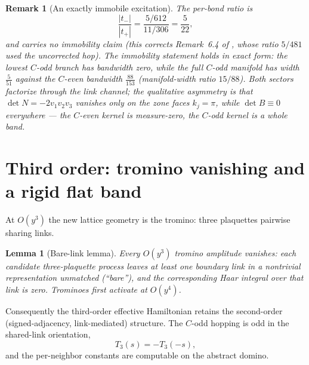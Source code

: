 \documentclass[11pt]{article}
\newtheorem{lemma}[theorem]{Lemma}
\newtheorem{remark}[theorem]{Remark}
\begin{document}
\begin{remark}[An exactly immobile excitation]\label{rem:immobile}
The per-bond ratio is
\[
\frac{|t_-|}{|t_+|}=\frac{5/612}{11/306}=\frac5{22},
\]
and carries no immobility claim (this corrects Remark~6.4 of \cite{companion}, whose ratio
$5/481$ used the uncorrected hop). The immobility statement holds in exact
form: the lowest $C$-odd branch has bandwidth zero, while the full $C$-odd
manifold has width $\tfrac{5}{51}$ against the $C$-even bandwidth
$\tfrac{88}{153}$ (manifold-width ratio $15/88$). Both sectors factorize
through the link channel; the qualitative asymmetry is that
$\det N=-2v_1v_2v_3$ vanishes only on the zone faces $k_j=\pi$, while
$\det B\equiv0$ everywhere --- the $C$-even kernel is measure-zero, the
$C$-odd kernel is a whole band.
\end{remark}

\section{Third order: tromino vanishing and a rigid flat band}
\label{sec:thirdorder}

At $O(y^3)$ the new lattice geometry is the tromino: three plaquettes
pairwise sharing links.

\begin{lemma}[Bare-link lemma]\label{lem:barelink}
Every $O(y^3)$ tromino amplitude vanishes: each candidate three-plaquette
process leaves at least one boundary link in a nontrivial representation
unmatched (``bare''), and the corresponding Haar integral over that link is
zero. Trominoes first activate at $O(y^4)$.
\end{lemma}

Consequently the third-order effective Hamiltonian retains the second-order
(signed-adjacency, link-mediated) structure. The $C$-odd hopping is odd in the
shared-link orientation,
\[
T_3(s)=-T_3(-s),
\]
and the per-neighbor constants are computable on the abstract domino.
\end{document}
